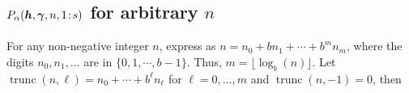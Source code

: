 \documentclass[authoryear]{elsarticle}
\newcommand{\tr}{\widetilde{r}}
\DeclareMathOperator{\appxint}{\hat{I}}
\DeclareMathOperator{\trun}{trunc}
\newcommand{\onetos}{1\!:\!s}
\begin{document}


\subsection{$P_{\alpha}(\vh,\vgamma,n,\onetos)$ for  arbitrary $n$}
For any non-negative integer $n$, express as  $n = n_0 + bn_1 + \cdots + b^m n_m$, where the digits $n_0, n_1, \ldots$ are in $\{0, 1, \cdots, b-1\}$. Thus, $m = \lfloor \log_b(n) \rfloor$.  Let $\trun(n,\ell) = n_0 + \cdots + b^{\ell} n_{\ell}$ for $\ell = 0, \ldots, m$ and $\trun(n,-1) = 0$, then
\end{document}
